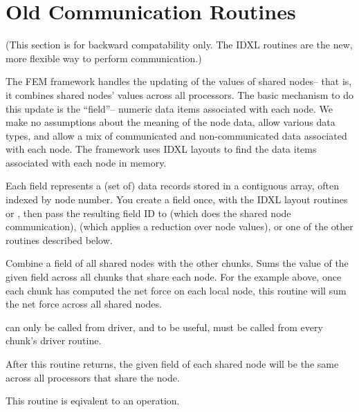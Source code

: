 \documentclass[10pt]{article}
\begin{document}




\section{Old Communication Routines}

(This section is for backward compatability only.  The IDXL routines
are the new, more flexible way to perform communication.)

The FEM framework handles the updating of the values of shared nodes-- that
is, it combines shared nodes' values across all processors.  The basic
mechanism to do this update is the ``field''-- numeric data items associated
with each node. We make no assumptions about the meaning of the node data,
allow various data types, and allow a mix of communicated and non-communicated 
data associated with each node.  The framework uses IDXL layouts to find the data items
associated with each node in memory.

Each field represents a (set of) data records stored in a contiguous array,
often indexed by node number.  You create a field once, with the IDXL layout 
routines or ,
then pass the resulting field ID to  (which does the
shared node communication),  (which applies a
reduction over node values), or one of the other routines described below.



     Combine a field of all shared nodes with the other chunks.  Sums
     the value of the given field across all chunks that share each
     node.  For the example above, once each chunk has computed the net
     force on each local node, this routine will sum the net force
     across all shared nodes.

      can only be called from driver, and to be useful,
     must be called from every chunk's driver routine.

     After this routine returns, the given field of each shared node
     will be the same across all processors that share the node.
     
     This routine is eqivalent to an  operation.
\end{document}
